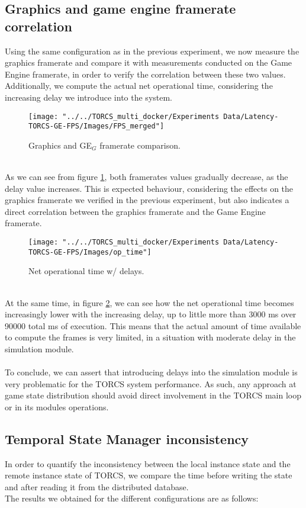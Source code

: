 \subsection{Graphics and game engine framerate correlation}
Using the same configuration as in the previous experiment, we now measure the graphics framerate and compare it with measurements conducted on the Game Engine framerate, in order to verify the correlation between these two values. Additionally, we compute the actual net operational time, considering the increasing delay we introduce into the system.
\begin{figure}[h!]
	\centering
	\texttt{[image: "../../TORCS\_multi\_docker/Experiments Data/Latency-TORCS-GE-FPS/Images/FPS\_merged"]}
	\caption[Graphics and GE$_G$ framerate comparison]{Graphics and GE$_G$ framerate comparison.}
	\label{fig:graphics-GE-fps}
\end{figure}
\\ As we can see from figure \ref{fig:graphics-GE-fps}, both framerates values gradually decrease, as the delay value increases. This is expected behaviour, considering the effects on the graphics framerate we verified in the previous experiment, but also indicates a direct correlation between the graphics framerate and the Game Engine framerate. \\
\begin{figure}[h!]
	\centering
	\texttt{[image: "../../TORCS\_multi\_docker/Experiments Data/Latency-TORCS-GE-FPS/Images/op\_time"]}
	\caption[Net operational time w/ delays]{Net operational time w/ delays.}
	\label{fig:op-time}
\end{figure}
\\ At the same time, in figure \ref{fig:op-time}, we can see how the net operational time becomes increasingly lower with the increasing delay, up to little more than 3000 ms over 90000 total ms of execution. This means that the actual amount of time available to compute the frames is very limited, in a situation with moderate delay in the simulation module. \\ \\
To conclude, we can assert that introducing delays into the simulation module is very problematic for the TORCS system performance. As such, any approach at game state distribution should avoid direct involvement in the TORCS main loop or in its modules operations.

\subsection{Temporal State Manager inconsistency}
In order to quantify the inconsistency between the local instance state and the remote instance state of TORCS, we compare the time before writing the state and after reading it from the distributed database. \\ The results we obtained for the different configurations are as follows:

